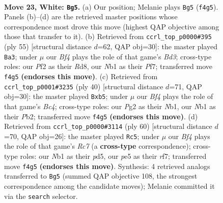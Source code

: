 \documentclass[11pt]{article}
\begin{document}
\clearpage

\begin{figure}[p]\centering
\begin{subfigure}{0.46\textwidth}\centering
\resizebox{\linewidth}{!}{%
\newchessgame
\chessboard[
  setfen={rn1r4/5kb1/2p5/4p3/p3RB1p/P7/RPP2PPP/1N3K2 w - - 0 23},
  showmover=false,
  pgfstyle=straightmove, color=movearrow, markmove={f4-g5}
]}
\caption{}
\end{subfigure}\hfill
\begin{subfigure}{0.46\textwidth}\centering
\resizebox{\linewidth}{!}{%
\newchessgame
\chessboard[
  setfen={3r2k1/1p2pp1p/3b2p1/3PP3/2R5/1r1N2P1/4P1KP/3R4 b - - 0 28},
  showmover=false,
  pgfstyle=straightmove, color=movearrow, markmove={d6-a3}
]}
\caption{}
\end{subfigure}
\\[4pt]
\begin{subfigure}{0.46\textwidth}\centering
\resizebox{\linewidth}{!}{%
\newchessgame
\chessboard[
  setfen={r5k1/4bpp1/5n1p/1pp1pP2/2B5/2P5/1P3PPP/1N2R1K1 w - - 0 21},
  showmover=false,
  pgfstyle=straightmove, color=movearrow, markmove={c4-b5}
]}
\caption{}
\end{subfigure}\hfill
\begin{subfigure}{0.46\textwidth}\centering
\resizebox{\linewidth}{!}{%
\newchessgame
\chessboard[
  setfen={r3b1k1/2R2rp1/4p3/3pP3/pR3B1p/P7/1P3PP1/6K1 w - - 1 31},
  showmover=false,
  pgfstyle=straightmove, color=movearrow, markmove={c7-c5}
]}
\caption{}
\end{subfigure}
\caption{\textbf{Move 23, White: \texttt{Bg5}.} (a) Our position; Melanie plays \texttt{Bg5} (\texttt{f4g5}). Panels (b)--(d) are the retrieved master positions whose correspondence most drove this move (highest QAP objective among those that transfer to it). (b) Retrieved from \texttt{ccrl\_top\_p0000\#395} (ply 55) [structural distance $d$=62, QAP obj=30]: the master played \texttt{Ba3}; under $\mu$ our \emph{Bf4} plays the role of that game's \emph{Bd3}; cross-type roles: our \emph{P}f2 as their \emph{R}d8, our \emph{N}b1 as their \emph{P}f7; transferred move \texttt{f4g5} \textbf{(endorses this move)}. (c) Retrieved from \texttt{ccrl\_top\_p0001\#3235} (ply 40) [structural distance $d$=71, QAP obj=30]: the master played \texttt{Bxb5}; under $\mu$ our \emph{Bf4} plays the role of that game's \emph{Bc4}; cross-type roles: our \emph{P}g2 as their \emph{N}b1, our \emph{N}b1 as their \emph{P}b2; transferred move \texttt{f4g5} \textbf{(endorses this move)}. (d) Retrieved from \texttt{ccrl\_top\_p0000\#3114} (ply 60) [structural distance $d$=70, QAP obj=26]: the master played \texttt{Rc5}; under $\mu$ our \emph{Bf4} plays the role of that game's \emph{Rc7} (a \textbf{cross-type} correspondence); cross-type roles: our \emph{N}b1 as their \emph{p}d5, our \emph{p}e5 as their \emph{r}f7; transferred move \texttt{f4g5} \textbf{(endorses this move)}. Synthesis: 4 retrieved analogs transferred to \texttt{Bg5} (summed QAP objective 108, the strongest correspondence among the candidate moves); Melanie committed it via the \texttt{search} selector.}
\label{fig:thought-m44}
\end{figure}
\end{document}
